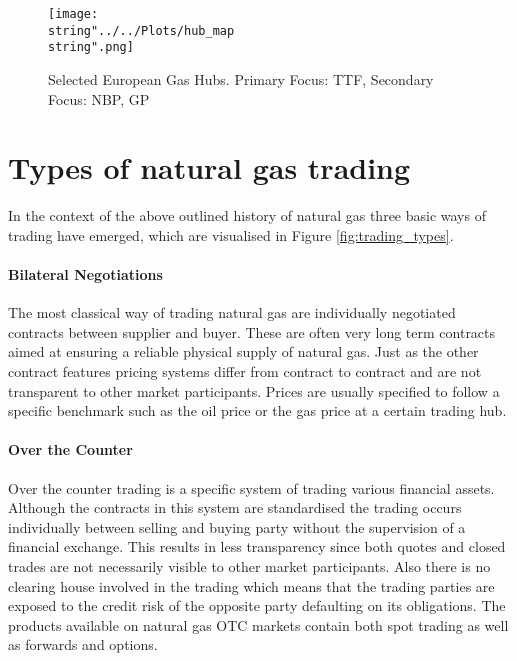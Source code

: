 \begin{figure}[H]
  \centering
\texttt{[image: \\string"../../Plots/hub\_map\\string".png]}
  \caption{Selected European Gas Hubs. Primary Focus: TTF, Secondary Focus: NBP, GP}\label{fig:hub_map}
\end{figure}

\section{Types of natural gas trading}
In the context of the above outlined history of natural gas three basic ways of trading have emerged, which are visualised in Figure \ref{fig:trading_types}.

\paragraph{Bilateral Negotiations}
The most classical way of trading natural gas are individually negotiated contracts between supplier and buyer. These are often very long term contracts aimed at ensuring a reliable physical supply of natural gas. Just as the other contract features pricing systems differ from contract to contract and are not transparent to other market participants. Prices are usually specified to follow a specific benchmark such as the oil price or the gas price at a certain trading hub. 

\paragraph{Over the Counter}
Over the counter trading is a specific system of trading various financial assets. Although the contracts in this system are standardised the trading occurs individually between selling and buying party without the supervision of a financial exchange. This results in less transparency since both quotes and closed trades are not necessarily visible to other market participants. Also there is no clearing house involved in the trading which means that the trading parties are exposed to the credit risk of the opposite party defaulting on its obligations. The products available on natural gas OTC markets contain both spot trading as well as forwards and options.

